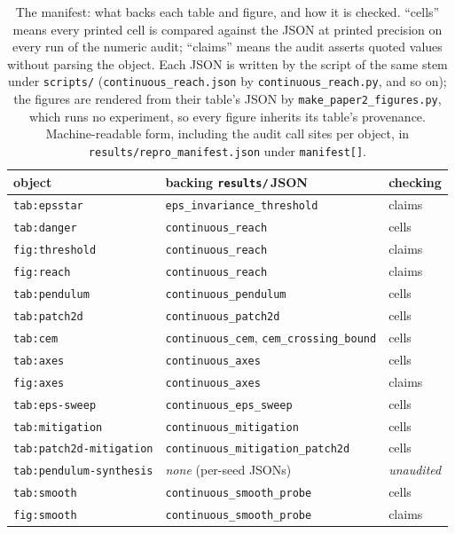\begin{table}[ht]
\centering
\footnotesize
\begin{tabular}{lll}
\toprule
object & backing \texttt{results/}\,JSON & checking \\
\midrule
\texttt{tab:epsstar} & \texttt{eps\_\allowbreak invariance\_\allowbreak threshold} & claims \\
\texttt{tab:danger} & \texttt{continuous\_\allowbreak reach} & cells \\
\texttt{fig:threshold} & \texttt{continuous\_\allowbreak reach} & claims \\
\texttt{fig:reach} & \texttt{continuous\_\allowbreak reach} & claims \\
\texttt{tab:pendulum} & \texttt{continuous\_\allowbreak pendulum} & cells \\
\texttt{tab:patch2d} & \texttt{continuous\_\allowbreak patch2d} & cells \\
\texttt{tab:cem} & \texttt{continuous\_cem}, \texttt{cem\_\allowbreak crossing\_\allowbreak bound} & cells \\
\texttt{tab:axes} & \texttt{continuous\_\allowbreak axes} & cells \\
\texttt{fig:axes} & \texttt{continuous\_\allowbreak axes} & claims \\
\texttt{tab:eps-sweep} & \texttt{continuous\_\allowbreak eps\_\allowbreak sweep} & cells \\
\texttt{tab:mitigation} & \texttt{continuous\_\allowbreak mitigation} & cells \\
\texttt{tab:\allowbreak patch2d-mitigation} & \texttt{continuous\_\allowbreak mitigation\_\allowbreak patch2d} & cells \\
\texttt{tab:\allowbreak pendulum-synthesis} & \emph{none} (per-seed JSONs) & \emph{unaudited} \\
\texttt{tab:smooth} & \texttt{continuous\_\allowbreak smooth\_\allowbreak probe} & cells \\
\texttt{fig:smooth} & \texttt{continuous\_\allowbreak smooth\_\allowbreak probe} & claims \\
\bottomrule
\end{tabular}
\caption{The manifest: what backs each table and figure, and how it is checked. ``cells''
means every printed cell is compared against the JSON at printed precision on every run of
the numeric audit; ``claims'' means the audit asserts quoted values without parsing the
object. Each JSON is written by the script of the same stem under \texttt{scripts/} (\texttt{continuous\_reach.json} by \texttt{continuous\_reach.py}, and so on); the figures are rendered from their table's JSON by \texttt{make\_paper2\_figures.py}, which runs no experiment, so every figure inherits its table's provenance. Machine-readable form, including the audit call sites per object, in
\texttt{results/\allowbreak repro\_\allowbreak manifest.\allowbreak json} under \texttt{manifest[]}.}
\label{tab:manifest}
\end{table}

